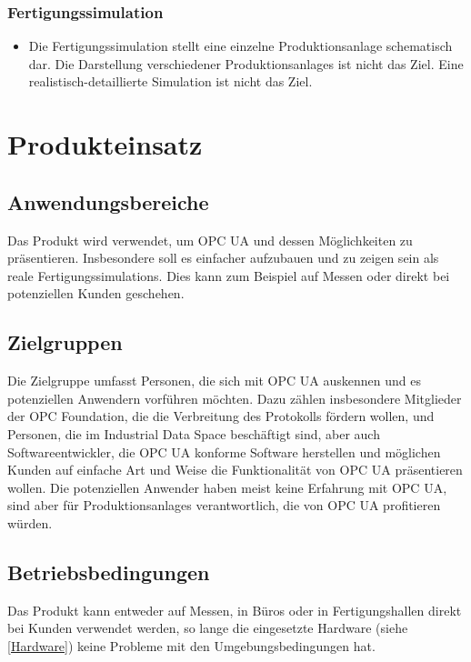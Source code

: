 \documentclass[parskip=full]{scrartcl}
\begin{document}
\subsubsection{Fertigungssimulation}
\begin{itemize}
  \item Die \gls{Fertigungssimulation} stellt eine einzelne \gls{Produktionsanlage} schematisch dar. Die Darstellung verschiedener \glspl{Produktionsanlage}
    ist nicht das Ziel. Eine realistisch-detaillierte Simulation ist nicht das Ziel.
\end{itemize}


\newpage
\section{Produkteinsatz}
\subsection{Anwendungsbereiche}
Das Produkt wird verwendet, um \gls{OPC UA} und dessen Möglichkeiten zu präsentieren.
Insbesondere soll es einfacher aufzubauen und zu zeigen sein als reale \glspl{Fertigungssimulation}.
Dies kann zum Beispiel auf Messen oder direkt bei potenziellen Kunden geschehen.

\subsection{Zielgruppen}
Die Zielgruppe umfasst Personen, die sich mit \gls{OPC UA} auskennen und es potenziellen Anwendern vorführen möchten.
Dazu zählen insbesondere Mitglieder der OPC Foundation, die die Verbreitung des Protokolls fördern wollen, und Personen, die im \gls{Industrial Data Space} beschäftigt sind,
aber auch Softwareentwickler, die \gls{OPC UA} konforme Software herstellen und möglichen Kunden auf einfache Art und
Weise die Funktionalität von \gls{OPC UA} präsentieren wollen.
Die potenziellen Anwender haben meist keine Erfahrung mit \gls{OPC UA}, sind aber für \glspl{Produktionsanlage} verantwortlich,
die von \gls{OPC UA} profitieren würden.

\subsection{Betriebsbedingungen}
Das Produkt kann entweder auf Messen, in Büros oder in Fertigungshallen direkt bei Kunden verwendet werden,
so lange die eingesetzte Hardware (siehe \ref{Hardware}) keine Probleme mit den Umgebungsbedingungen hat.
\end{document}
